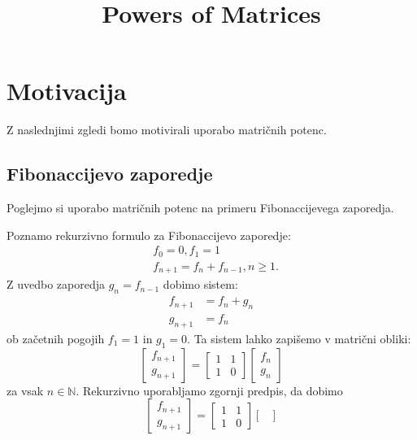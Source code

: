 \documentclass[mat1]{fmfdelo}
\title{Powers of Matrices}
\begin{document}
\section{Motivacija}
Z naslednjimi zgledi bomo motivirali uporabo matričnih potenc.
\subsection{Fibonaccijevo zaporedje}

Poglejmo si uporabo matričnih potenc na primeru Fibonaccijevega zaporedja.
\begin{zgled} 
    Poznamo rekurzivno formulo za Fibonaccijevo zaporedje:
    \begin{align*}
        &f_0 = 0, f_1 = 1 \\
        &f_{n+1} = f_n + f_{n-1}, n \geq 1.
    \end{align*}
    Z uvedbo zaporedja $g_n = f_{n-1}$ dobimo sistem:
    \begin{align*}
        f_{n+1} &= f_n + g_n \\
        g_{n+1} &= f_n
    \end{align*}
    ob začetnih pogojih $f_1 = 1$ in $g_1 = 0$. Ta sistem lahko zapišemo v matrični obliki:
    \begin{equation*}
        \begin{bmatrix}
            f_{n+1} \\
            g_{n+1}
        \end{bmatrix}
        =
        \begin{bmatrix}
            1 & 1 \\
            1 & 0
        \end{bmatrix}
        \begin{bmatrix}
            f_n \\
            g_n
        \end{bmatrix}
    \end{equation*}
    za vsak $n \in \mathbb{N}$. Rekurzivno uporabljamo zgornji predpis, da dobimo
    \begin{equation*}
        \begin{bmatrix}
            f_{n+1} \\
            g_{n+1}
        \end{bmatrix}
        =
        \begin{bmatrix}
            1 & 1 \\
            1 & 0
        \end{bmatrix}
        \begin{bmatrix}

\end{bmatrix}
\end{equation*}
\end{zgled}
\end{document}
